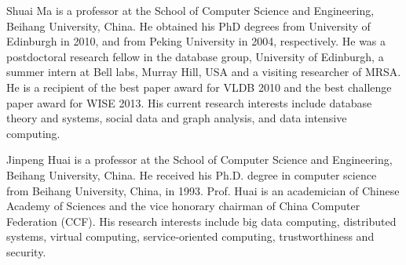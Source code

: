 \documentclass[10pt,journal,compsoc]{IEEEtran}
\begin{document}
\vspace{-8ex}
\begin{IEEEbiography}
{Shuai Ma} is a professor at the School of Computer Science and Engineering, Beihang University, China.
He obtained his PhD degrees from University of Edinburgh in 2010, and from
Peking University in 2004, respectively.
He was a postdoctoral research fellow in the database group, University of Edinburgh, a summer intern at Bell labs, Murray Hill, USA and a visiting researcher of MRSA.
He is a recipient of the best paper award for VLDB 2010 and the best challenge paper award for WISE 2013. His current research interests include database theory and systems, social data and graph analysis, and data intensive computing.
\end{IEEEbiography}
\vspace{-8ex}
\begin{IEEEbiography}
{Jinpeng Huai} is a professor at the School of Computer Science and Engineering, Beihang University, China. He received his Ph.D. degree in computer science from Beihang University, China, in 1993. Prof. Huai is an academician of Chinese Academy of Sciences and the vice honorary chairman of China Computer Federation (CCF). His research interests include big data computing, distributed systems, virtual computing, service-oriented computing, trustworthiness and security.
\end{IEEEbiography}

\end{document}
